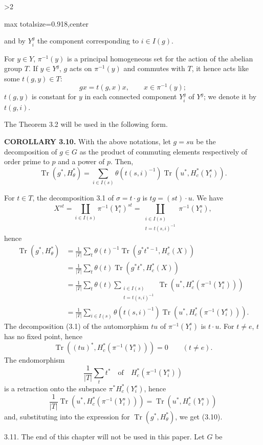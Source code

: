 \documentclass[9pt,twoside]{extarticle}
\newcommand{\EditionPage}[3]{%
  \ifnum#1>2\clearpage\fi
  \pdfbookmark[1]{Printed page #2}{en-folio-#2}%
  \hypertarget{en-physical-#1}{}%
  \noindent\begin{adjustbox}{max totalsize={\textwidth}{0.918\textheight},center}
  \begin{minipage}[t]{\textwidth}
  \fontsize{9.4}{11.1}\selectfont\justifying
  #3
  \end{minipage}
  \end{adjustbox}%
}
\begin{document}
\EditionPage{21}{122}{%
and by \(Y_i^g\) the component corresponding to \(i\in I(g)\).\par

For \(y\in Y\), \(\pi^{-1}(y)\) is a principal homogeneous set for the action of the abelian group \(T\). If \(y\in Y^g\), \(g\) acts on \(\pi^{-1}(y)\) and commutes with \(T\), it hence acts like some \(t(g,y)\in T\): \[
gx=t(g,x)x,\qquad x\in\pi^{-1}(y);
\]  \(t(g,y)\) is constant for \(y\) in each connected component \(Y_i^g\) of \(Y^g\); we denote it by \(t(g,i)\).\par

The Theorem 3.2 will be used in the following form.\par

\noindent\textbf{COROLLARY 3.10.} With the above notations, let \(g=su\) be the decomposition of \(g\in G\) as the product of commuting elements respectively of order prime to \(p\) and a power of \(p\). Then, \[
\operatorname{Tr}(g^*,H_\theta^*)
=
\sum_{i\in I(s)}\theta(t(s,i)^{-1})\operatorname{Tr}(u^*,H_c^*(Y_i^s)).
\]\par

For \(t\in T\), the decomposition 3.1 of \(\sigma=t\cdot g\) is \(tg=(st)\cdot u\). We have \[
X^{st}
=
\coprod_{i\in I(s)}\pi^{-1}(Y_i^s)^{st}
=
\coprod_{\substack{i\in I(s)\\t=t(s,i)^{-1}}}\pi^{-1}(Y_i^s),
\] hence \[
\begin{aligned}
\operatorname{Tr}(g^*,H_\theta^*)
&=\frac1{|T|}\sum_t\theta(t)^{-1}\operatorname{Tr}(g^*t^{*-1},H_c^*(X))\\
&=\frac1{|T|}\sum_t\theta(t)\operatorname{Tr}(g^*t^*,H_c^*(X))\\
&=\frac1{|T|}\sum_t\theta(t)\sum_{\substack{i\in I(s)\\t=t(s,i)^{-1}}}
\operatorname{Tr}(u^*,H_c^*(\pi^{-1}(Y_i^s)))\\
&=\frac1{|T|}\sum_{i\in I(s)}\theta(t(s,i)^{-1})
\operatorname{Tr}(u^*,H_c^*(\pi^{-1}(Y_i^s))).
\end{aligned}
\] The decomposition (3.1) of the automorphism \(tu\) of \(\pi^{-1}(Y_i^s)\) is \(t\cdot u\). For \(t\ne e\), \(t\) has no fixed point, hence \[
\operatorname{Tr}((tu)^*,H_c^*(\pi^{-1}(Y_i^s)))=0
\qquad(t\ne e).
\] The endomorphism \[
\frac1{|T|}\sum_t t^*\quad\text{of}\quad H_c^*(\pi^{-1}(Y_i^s))
\] is a retraction onto the subspace \(\pi^*H_c^*(Y_i^s)\), hence \[
\frac1{|T|}\operatorname{Tr}(u^*,H_c^*(\pi^{-1}(Y_i^s)))
=
\operatorname{Tr}(u^*,H_c^*(Y_i^s))
\] and, substituting into the expression for \(\operatorname{Tr}(g^*,H_\theta^*)\), we get (3.10).\par

3.11. The end of this chapter will not be used in this paper. Let \(G\) be\par
}
\end{document}
